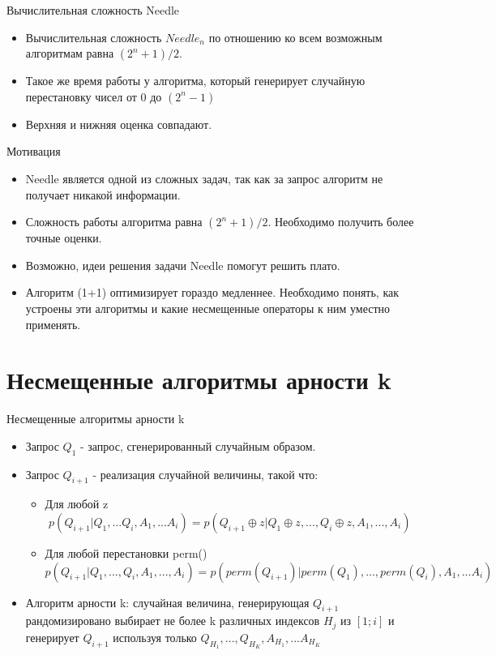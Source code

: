 \documentclass{beamer}
\begin{document}
 \begin{frame}{Вычислительная сложность Needle}
  \begin{itemize}
   \item Вычислительная сложность $Needle_n$ по отношению ко всем возможным алгоритмам равна $(2^n + 1) / 2$.
   \item Такое же время работы у алгоритма, который генерирует
случайную перестановку чисел от 0 до $(2^n - 1)$
   \item Верхняя и нижняя оценка совпадают.
  \end{itemize}
 \end{frame} 


  \begin{frame}{Мотивация}
  \begin{itemize}
   \item Needle является одной из сложных задач, так как за запрос алгоритм не получает никакой информации.
   \item Сложность работы алгоритма равна $(2^n + 1) / 2$. Необходимо получить более точные оценки.
   \item Возможно, идеи решения задачи Needle помогут решить плато. 
   \item Алгоритм (1+1) оптимизирует гораздо медленнее. Необходимо понять, как устроены эти алгоритмы и какие несмещенные операторы к ним уместно применять.
   
  \end{itemize}
 \end{frame}


 \section{Несмещенные алгоритмы арности k}
 
 \begin{frame}{Несмещенные алгоритмы арности k}
  \begin{itemize}
   \item Запрос $Q_1$ - запрос, сгенерированный случайным образом.
   \item Запрос $Q_{i+1}$ - реализация случайной величины, такой что:
        \begin{itemize}
            
            \item  Для любой z $$ p(Q_{i+1} | Q_1, ... Q_i, A_1, ... A_i) = p(Q_{i+1} \oplus z | Q_1 \oplus z, ..., Q_i \oplus z, A_1, ..., A_i)$$  
            
            \item Для любой перестановки perm() 
            $  p(Q_{i+1} | Q_1, ..., Q_i, A_1, ..., A_i) = p(perm(Q_{i+1}) |perm(Q_1), ..., perm(Q_i), A_1, ... A_i) $ 
            
        \end{itemize}

 \item Алгоритм арности k: случайная величина, генерирующая $Q_{i+1}$ рандомизировано выбирает не более k различных индексов $H_j$ из $[1; i]$ и генерирует $Q_{i+1}$ используя только $Q_{H_1}, ..., Q_{H_K}, A_{H_1}, ... A_{H_K}$
  \end{itemize}
 \end{frame}
 
\end{document}

